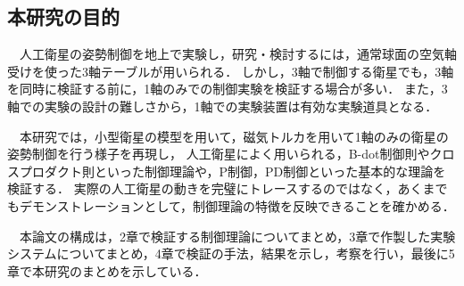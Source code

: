 \subsection{本研究の目的}
　人工衛星の姿勢制御を地上で実験し，研究・検討するには，通常球面の空気軸受けを使った3軸テーブルが用いられる．
しかし，3軸で制御する衛星でも，3軸を同時に検証する前に，1軸のみでの制御実験を検証する場合が多い\cite{intro6}．
また，3軸での実験の設計の難しさから，1軸での実験装置は有効な実験道具となる．

　本研究では，小型衛星の模型を用いて，磁気トルカを用いて1軸のみの衛星の姿勢制御を行う様子を再現し，
人工衛星によく用いられる，B-dot制御則やクロスプロダクト則といった制御理論や，P制御，PD制御といった基本的な理論を検証する．
実際の人工衛星の動きを完璧にトレースするのではなく，あくまでもデモンストレーションとして，制御理論の特徴を反映できることを確かめる．

　本論文の構成は，2章で検証する制御理論についてまとめ，3章で作製した実験システムについてまとめ，4章で検証の手法，結果を示し，考察を行い，最後に5章で本研究のまとめを示している．